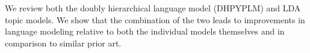 We review both  the doubly hierarchical language model (DHPYPLM) \cite{Wood2009a} and LDA topic models.  We show that the combination of the two leads to improvements in language modeling relative to both the individual models themselves and in comparison to similar prior art.

